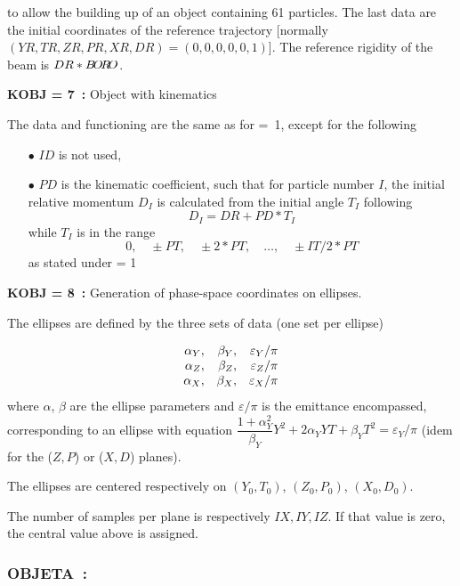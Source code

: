  \noindent to allow the building up of an object containing 61 particles.  The
last data are the initial coordinates of the reference 
trajectory [normally $(YR, TR, ZR, PR, XR, DR) = (0, 0, 0, 0, 0, 1)$]. 
The reference rigidity of the beam  is $ DR\ast B\!O\!R\!O$.  

\bigskip


\noindent\textbf{KOBJ = 7~:} Object with kinematics 

\noindent The data and functioning are the same as for \mbox{\KOBJ= 1}, except for the 
following  
\begin{itemize}
\item[$\bullet$]  $ ID $ is not used,  
\item[$\bullet$]  $ PD $ is the kinematic coefficient, such that for particle
number $ I$,  the initial relative momentum $ D_I $ is calculated from the initial angle 
$T_I $ following
$$ D_I = DR+ PD \ast  T_I $$
 while $ T_I $ is in the range
$$ 0,\quad \pm PT,\quad \pm 2\ast PT,\quad \ldots,\quad \pm IT/2\ast PT $$
 as stated under \KOBJ = 1
\end{itemize}


\noindent\textbf{KOBJ = 8~:} Generation of phase-space coordinates on ellipses. 

\noindent The ellipses are defined by  the three sets of data (one set per 
  ellipse) 

$$
\begin{array}{*{2}{r<{,}}r}
 \alpha_ Y  &   \beta_ Y  
            &  \varepsilon_Y / \pi \\
\alpha_ Z   &  \beta_ Z  
            &  \varepsilon_Z / \pi \\
\alpha_ X   & \beta_ X 
            &  \varepsilon_X / \pi 
\end{array}           
$$            
%
where $\alpha$, $\beta$ are the ellipse parameters and $\varepsilon/ 
\pi$ is the emittance encompassed, corresponding to an ellipse with equation 
$\dfrac{1 + \alpha^2_Y}{\beta_Y} Y^2 + 2 \alpha_Y YT + \beta_Y T^2 = 
\varepsilon_Y / \pi$ (idem for the ($Z, P$) or ($X, D$) planes). 

\noindent The ellipses are centered respectively on $(Y_0, T_0)$, $(Z_0, P_0)$, $(X_0, D_0)$.  

\noindent The number of samples per plane is respectively $IX, IY, IZ$.  If that value is zero, 
the central value above is assigned. 
 

\newpage


\subsubsection*{OBJETA~:   \OBJETATitl\ \protect\cite{Biblio9}}  %
 \label{OBJETA} 
 
